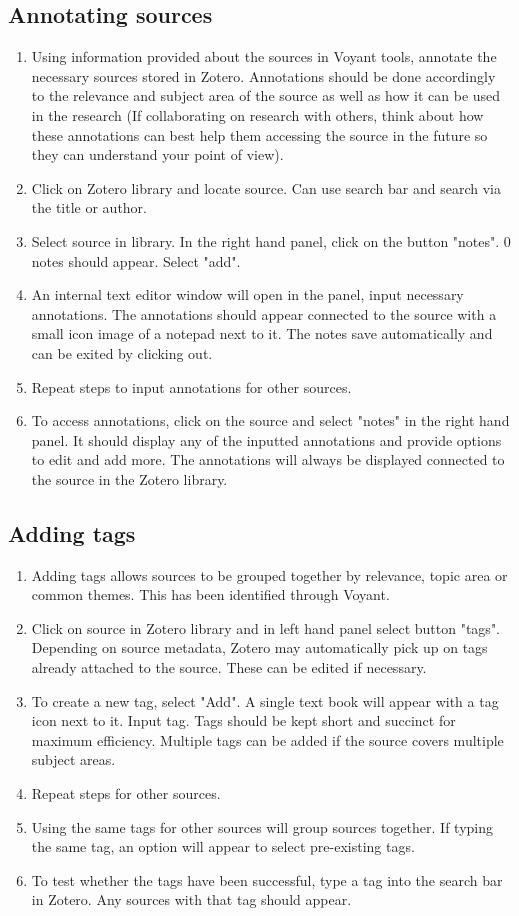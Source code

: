 \documentclass{article}
\begin{document}
\subsection{Annotating sources}
\begin{enumerate}
    \item Using information provided about the sources in Voyant tools, annotate the necessary sources stored in Zotero. Annotations should be done accordingly to the relevance and subject area of the source as well as how it can be used in the research (If collaborating on research with others, think about how these annotations can best help them accessing the source in the future so they can understand your point of view). 
    \item Click on Zotero library and locate source. Can use search bar and search via the title or author.
    \item Select source in library. In the right hand panel, click on the button "notes". 0 notes should appear. Select "add".
    \item An internal text editor window will open in the panel, input necessary annotations. The annotations should appear connected to the source with a small icon image of a notepad next to it. The notes save automatically and can be exited by clicking out.
    \item Repeat steps to input annotations for other sources.
    \item To access annotations, click on the source and select "notes" in the right hand panel. It should display any of the inputted annotations and provide options to edit and add more. The annotations will always be displayed connected to the source in the Zotero library.
\end{enumerate}

\subsection{Adding tags}
\begin{enumerate}
    \item Adding tags allows sources to be grouped together by relevance, topic area or common themes. This has been identified through Voyant.
    \item Click on source in Zotero library and in left hand panel select button "tags". Depending on source metadata, Zotero may automatically pick up on tags already attached to the source. These can be edited if necessary.
    \item To create a new tag, select "Add". A single text book will appear with a tag icon next to it. Input tag. Tags should be kept short and succinct for maximum efficiency. Multiple tags can be added if the source covers multiple subject areas.
    \item Repeat steps for other sources. 
    \item Using the same tags for other sources will group sources together. If typing the same tag, an option will appear to select pre-existing tags. 
    \item To test whether the tags have been successful, type a tag into the search bar in Zotero. Any sources with that tag should appear.
\end{enumerate}
\end{document}

